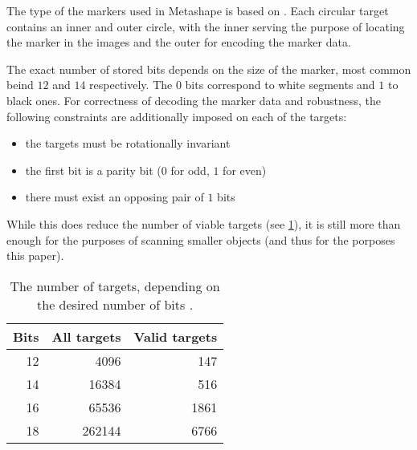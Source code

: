 The type of the markers used in Metashape is based on \citet{schneider19913,borisPatent}.
Each circular target contains an inner and outer circle, with the inner serving the purpose of locating the marker in the images and the outer for encoding the marker data.

The exact number of stored bits depends on the size of the marker, most common beind $12$ and $14$ respectively.
The $0$ bits correspond to white segments and $1$ to black ones.
For correctness of decoding the marker data and robustness, the following constraints are additionally imposed on each of the targets:

\begin{itemize}
	\item the targets must be rotationally invariant
	\item the first bit is a parity bit ($0$ for odd, $1$ for even)
	\item there must exist an opposing pair of $1$ bits
\end{itemize}

While this does reduce the number of viable targets (see \cref{tab:markers}), it is still more than enough for the purposes of scanning smaller objects (and thus for the porposes this paper).

\begin{table}
\centering\footnotesize\sf
\begin{tabular}{rrr}
\toprule
Bits & All targets & Valid targets \\
\midrule
12 & 4096   & 147 \\
14 & 16384  & 516 \\
16 & 65536  & 1861 \\
18 & 262144 & 6766 \\
\bottomrule
\end{tabular}
\caption{The number of targets, depending on the desired number of bits \cite{targetsPost}.}
\label{tab:markers}
\end{table}
